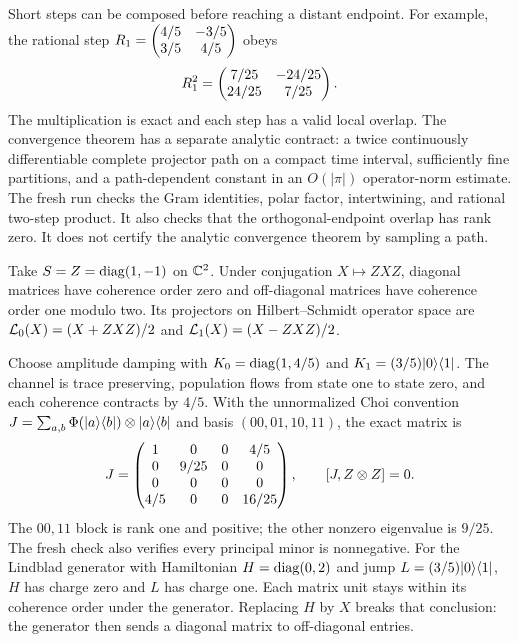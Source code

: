 Short steps can be composed before reaching a distant endpoint. For example, the rational step $R_1=\begin{pmatrix}4/5&-3/5\\3/5&4/5\end{pmatrix}$ obeys
\[
R_1^2=\begin{pmatrix}7/25&-24/25\\24/25&7/25\end{pmatrix}.
\]
The multiplication is exact and each step has a valid local overlap. The convergence theorem has a separate analytic contract: a twice continuously differentiable complete projector path on a compact time interval, sufficiently fine partitions, and a path-dependent constant in an $O(|\pi|)$ operator-norm estimate.
The fresh run checks the Gram identities, polar factor, intertwining, and rational two-step product. It also checks that the orthogonal-endpoint overlap has rank zero. It does not certify the analytic convergence theorem by sampling a path.

Take $S=Z=\operatorname{diag}(1,-1)$ on $\CC^2$. Under conjugation $X\mapsto ZXZ$, diagonal matrices have coherence order zero and off-diagonal matrices have coherence order one modulo two. Its projectors on Hilbert--Schmidt operator space are $\Lcal_0(X)=(X+ZXZ)/2$ and $\Lcal_1(X)=(X-ZXZ)/2$.

Choose amplitude damping with $K_0=\operatorname{diag}(1,4/5)$ and $K_1=(3/5)\lvert 0\rangle\langle 1\rvert$. The channel is trace preserving, population flows from state one to state zero, and each coherence contracts by $4/5$.
With the unnormalized Choi convention $J=\sum_{a,b}\Phi(\lvert a\rangle\langle b\rvert)\otimes\lvert a\rangle\langle b\rvert$ and basis $(00,01,10,11)$, the exact matrix is
\[
J=\begin{pmatrix}1&0&0&4/5\\0&9/25&0&0\\0&0&0&0\\4/5&0&0&16/25\end{pmatrix},
\qquad [J,Z\otimes Z]=0.
\]
The $00,11$ block is rank one and positive; the other nonzero eigenvalue is $9/25$. The fresh check also verifies every principal minor is nonnegative.
For the Lindblad generator with Hamiltonian $H=\operatorname{diag}(0,2)$ and jump $L=(3/5)\lvert 0\rangle\langle 1\rvert$, $H$ has charge zero and $L$ has charge one. Each matrix unit stays within its coherence order under the generator. Replacing $H$ by $X$ breaks that conclusion: the generator then sends a diagonal matrix to off-diagonal entries.

